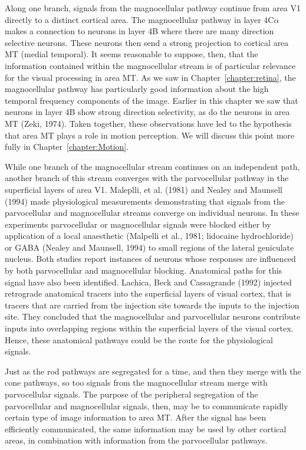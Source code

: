Along one branch, signals from the magnocellular
pathway continue from area V1 directly
to a distinct cortical area.
The magnocellular pathway
in layer 4C$\alpha$ makes a connection to
neurons in layer 4B where there are many direction
selective neurons.
These neurons then send a strong
projection to cortical area MT (medial temporal).
It seems reasonable to suppose, then, that the information
contained within the magnocellular stream is of particular
relevance for the visual processing in area MT.
As we saw in Chapter~\ref{chapter:retina}, the magnocellular
pathway has particularly good information about the high
temporal frequency components of the image.
Earlier in this chapter we saw
that neurons in layer 4B show strong direction selectivity,
as do the neurons in area MT (Zeki, 1974).
Taken together, these observations have led to the hypothesis
that area MT plays a role in motion perception.
We will discuss this point more fully in Chapter~\ref{chapter:Motion}.

While one branch of the magnocellular stream continues on an
independent path,
another branch of this stream converges with the parvocellular pathway
in the superficial layers of area V1.
Maleplli, et al. (1981) and Nealey and Maunsell (1994)
made physiological measurements demonstrating
that signals from the parvocellular
and magnocellular streams converge on individual neurons.
In these experiments parvocellular or magnocellular signals
were blocked either by application of a local
anaesthetic (Malpelli et al., 1981; lidocaine hydrochloride)
or GABA (Nealey and Maunsell, 1994)
to small regions of the lateral geniculate nucleus.
Both studies report instances of neurons whose responses
are influenced by both parvocellular and magnocellular
blocking.
Anatomical paths for this signal have also been identified.
Lachica, Beck and Cassagrande (1992)
injected retrograde anatomical tracers into the superficial
layers of visual cortex,
that is tracers that are carried from
the injection site towards the inputs to the injection site.
They concluded that the magnocellular and parvocellular
neurons contribute inputs
into overlapping regions within
the superficial layers of the visual cortex.
Hence, these anatomical
pathways could be the route for the physiological signals.

Just as the rod pathways are segregated for a time,
and then they merge with the cone pathways, so too 
signals from the
magnocellular stream merge with parvocellular signals.
The purpose of the peripheral segregation of
the parvocellular and magnocellular signals, then,
may be to communicate rapidly certain
type of image information to area MT.
After the signal has been efficiently communicated,
the same information may
be used by other cortical areas, in combination
with information from the parvocellular pathways.

